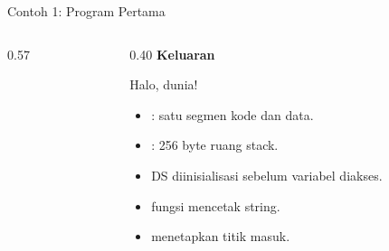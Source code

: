 \documentclass[aspectratio=169,11pt]{beamer}
\begin{document}
\begin{frame}[fragile]{Contoh 1: Program Pertama}
\begin{columns}[t]
\begin{column}{0.57\textwidth}
\end{column}
\begin{column}{0.40\textwidth}
\footnotesize
{\color{obeTeal}\bfseries Keluaran}\\[0.15em]
\begin{keluaran}
Halo, dunia!
\end{keluaran}

\vspace{0.3em}
\begin{itemize}
    \item {}: satu segmen kode dan data.
    \item {}: 256 byte ruang stack.
    \item DS diinisialisasi sebelum variabel diakses.
    \item {} fungsi  mencetak string.
    \item {} menetapkan titik masuk.
\end{itemize}
\end{column}
\end{columns}
\end{frame}
\end{document}
